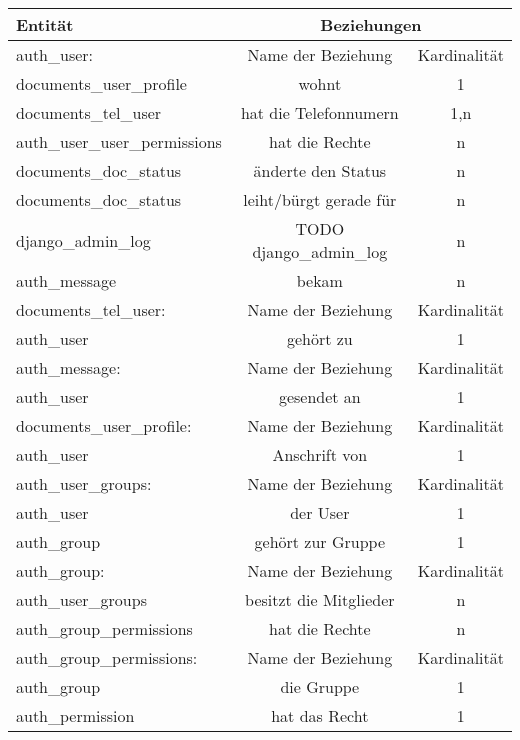 \begin{tabular}[ht]{|l||c|c|}
  \hline
  Entit\"at & \multicolumn{2}{c|}{Beziehungen} \\
  \hline\hline\hline
    
  auth\_user: & Name der Beziehung & Kardinalität\\
  \hline\hline
  documents\_user\_profile & wohnt & 1\\
  \hline
  documents\_tel\_user & hat die Telefonnumern & 1,n\\
  \hline
  auth\_user\_user\_permissions & hat die Rechte & n\\
  \hline
  documents\_doc\_status & änderte den Status & n\\  
  \hline
  documents\_doc\_status & leiht/bürgt gerade für & n\\
  \hline
  django\_admin\_log & TODO django\_admin\_log & n\\
  \hline
  auth\_message & bekam & n\\
  \hline\hline\hline
  
  documents\_tel\_user:  & Name der Beziehung &  Kardinalit\"at\\
  \hline\hline
  auth\_user & gehört zu & 1 \\
  \hline\hline\hline 
  
  auth\_message: & Name der Beziehung &  Kardinalit\"at\\
  \hline\hline
  auth\_user & gesendet an & 1 \\
  \hline\hline\hline 
  
  documents\_user\_profile:  & Name der Beziehung &  Kardinalit\"at\\
  \hline\hline
  auth\_user & Anschrift von & 1 \\
  \hline\hline\hline
  
  auth\_user\_groups:  & Name der Beziehung &  Kardinalit\"at\\
  \hline\hline
  auth\_user & der User & 1 \\
  \hline
  auth\_group & gehört zur Gruppe & 1 \\
  \hline\hline\hline
  
  auth\_group: & Name der Beziehung &  Kardinalit\"at\\
  \hline\hline
  auth\_user\_groups & besitzt die Mitglieder & n \\
  \hline
  auth\_group\_permissions & hat die Rechte & n \\
  \hline\hline\hline 

  auth\_group\_permissions: & Name der Beziehung &  Kardinalit\"at\\
  \hline\hline
  auth\_group & die Gruppe & 1 \\
  \hline
  auth\_permission & hat das Recht & 1 \\
  \hline\hline\hline 
  

\end{tabular}
